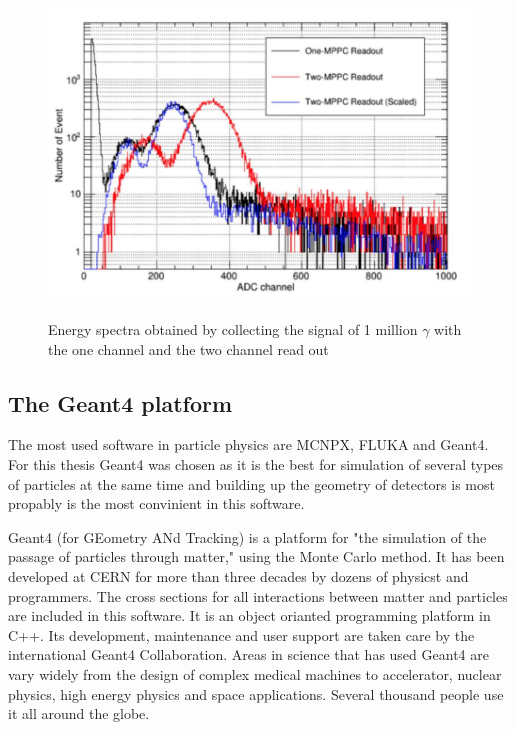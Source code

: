 \documentclass[12pt, a4paper,titlepage]{article}
\numberwithin{equation}{section}
\numberwithin{figure}{section}
\begin{document}
\begin{figure}[H]
\centering
\includegraphics[width=130.0mm]{images/histo_for_det.png}
\label{fig:spectras_meas}
\caption{Energy spectra obtained by collecting the signal of 1 million $\gamma$ with the one channel and the two channel read out \cite{kento}}
\label{fig:spectra}
\end{figure}

\subsection{The Geant4 platform}

The most used software in particle physics are MCNPX, FLUKA and Geant4. For this thesis Geant4 was chosen as it is the best for simulation of several types of particles at the same time and building up the geometry of detectors is most propably is the most convinient in this software. 

Geant4 \cite{geant1, geant2, geant3} (for GEometry ANd Tracking) is a platform for "the simulation of the passage of particles through matter," using the Monte Carlo method. It has been developed at CERN for more than three decades by dozens of physicst and programmers. The cross sections for all interactions between matter and particles are included in this software. It is an object orianted programming platform in C++. Its development, maintenance and user support are taken care by the international Geant4 Collaboration. Areas in science that has used Geant4 are vary widely from the design of complex medical machines to accelerator, nuclear physics, high energy physics and space applications. Several thousand people use it all around the globe.
\end{document}
